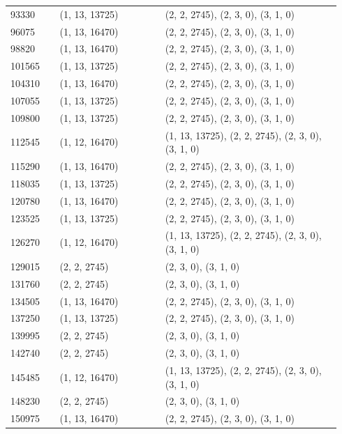 \begin{longtable}{@{}p{0.14\linewidth}p{0.30\linewidth}p{0.50\linewidth}@{}}
93330  & (1, 13, 13725) & (2, 2, 2745), (2, 3, 0), (3, 1, 0)                  \\
96075  & (1, 13, 16470) & (2, 2, 2745), (2, 3, 0), (3, 1, 0)                  \\
98820  & (1, 13, 16470) & (2, 2, 2745), (2, 3, 0), (3, 1, 0)                  \\
101565 & (1, 13, 13725) & (2, 2, 2745), (2, 3, 0), (3, 1, 0)                  \\
104310 & (1, 13, 16470) & (2, 2, 2745), (2, 3, 0), (3, 1, 0)                  \\
107055 & (1, 13, 13725) & (2, 2, 2745), (2, 3, 0), (3, 1, 0)                  \\
109800 & (1, 13, 13725) & (2, 2, 2745), (2, 3, 0), (3, 1, 0)                  \\
112545 & (1, 12, 16470) & (1, 13, 13725), (2, 2, 2745), (2, 3, 0), (3, 1, 0)  \\
115290 & (1, 13, 16470) & (2, 2, 2745), (2, 3, 0), (3, 1, 0)                  \\
118035 & (1, 13, 13725) & (2, 2, 2745), (2, 3, 0), (3, 1, 0)                  \\
120780 & (1, 13, 16470) & (2, 2, 2745), (2, 3, 0), (3, 1, 0)                  \\
123525 & (1, 13, 13725) & (2, 2, 2745), (2, 3, 0), (3, 1, 0)                  \\
126270 & (1, 12, 16470) & (1, 13, 13725), (2, 2, 2745), (2, 3, 0), (3, 1, 0)  \\
129015 & (2, 2, 2745)   & (2, 3, 0), (3, 1, 0)                                \\
131760 & (2, 2, 2745)   & (2, 3, 0), (3, 1, 0)                                \\
134505 & (1, 13, 16470) & (2, 2, 2745), (2, 3, 0), (3, 1, 0)                  \\
137250 & (1, 13, 13725) & (2, 2, 2745), (2, 3, 0), (3, 1, 0)                  \\
139995 & (2, 2, 2745)   & (2, 3, 0), (3, 1, 0)                                \\
142740 & (2, 2, 2745)   & (2, 3, 0), (3, 1, 0)                                \\
145485 & (1, 12, 16470) & (1, 13, 13725), (2, 2, 2745), (2, 3, 0), (3, 1, 0)  \\
148230 & (2, 2, 2745)   & (2, 3, 0), (3, 1, 0)                                \\
150975 & (1, 13, 16470) & (2, 2, 2745), (2, 3, 0), (3, 1, 0)                  \\

\end{longtable}
